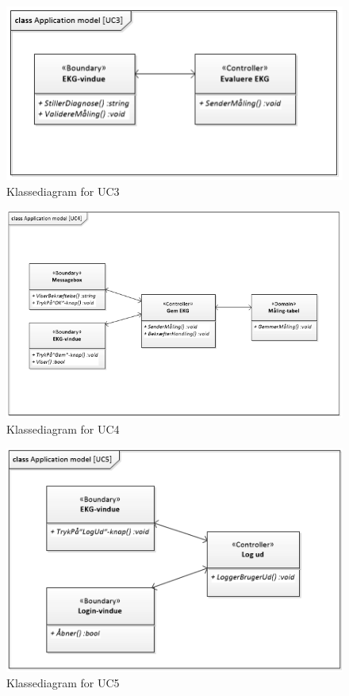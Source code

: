 \begin{figure}[H]
	\centering
	\includegraphics[width=1\textwidth]{Figurer/Snip20150429_23}
	\caption{Klassediagram for UC3}
\end{figure}

\begin{figure}[H]
	\centering
	\includegraphics[width=1\textwidth]{Figurer/Snip20150429_26}
	\caption{Klassediagram for UC4}
\end{figure}

\begin{figure}[H]
	\centering
	\includegraphics[width=1\textwidth]{Figurer/Snip20150429_25}
	\caption{Klassediagram for UC5}
\end{figure}





